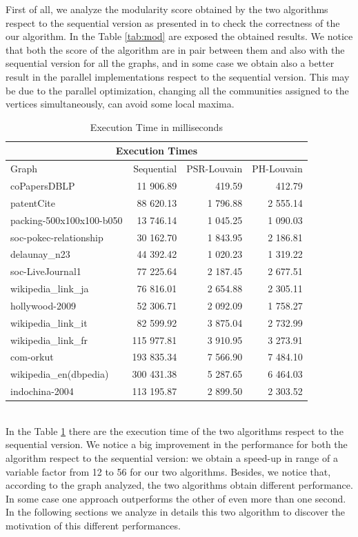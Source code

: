 First of all, we analyze the modularity score obtained by the two algorithms respect to the sequential version as presented in \cite{Blondel_2008} to check the correctness of the our algorithm. In the Table \ref{tab:mod} are exposed the obtained results. We notice that both the score of the algorithm are in pair between them and also with the sequential version for all the graphs, and in some case we obtain also a better result in the parallel implementations respect to the sequential version. This  may be due to the parallel optimization, changing all the communities assigned to the vertices simultaneously, can avoid some local maxima.
\begin{table}
	\centering
	\begin{tabular}{ |l||r||r|r|}
		\hline
		\multicolumn{4}{|c|}{Execution Times} \\
		\hline
		Graph & Sequential & PSR-Louvain & PH-Louvain \\
		\hline
		coPapersDBLP 			&  11 906.89 &   419.59 &  412.79 \\
		patentCite 				&  88 620.13 & 1 796.88 & 2 555.14 \\
		packing-500x100x100-b050&  13 746.14 & 1 045.25 & 1 090.03 \\
		soc-pokec-relationship	&  30 162.70 & 1 843.95 & 2 186.81 \\ 
		delaunay\_n23 			&  44 392.42 & 1 020.23 & 1 319.22 \\
		soc-LiveJournal1 		&  77 225.64 & 2 187.45 & 2 677.51 \\
		wikipedia\_link\_ja 	&  76 816.01 & 2 654.88 & 2 305.11 \\
		hollywood-2009 			&  52 306.71 & 2 092.09 & 1 758.27 \\
		wikipedia\_link\_it 	&  82 599.92 & 3 875.04 & 2 732.99 \\
		wikipedia\_link\_fr 	& 115 977.81 & 3 910.95 & 3 273.91 \\
		com-orkut 				& 193 835.34 & 7 566.90 & 7 484.10 \\
		wikipedia\_en(dbpedia) 	& 300 431.38 & 5 287.65 & 6 464.03 \\
		indochina-2004 			& 113 195.87 & 2 899.50 & 2 303.52 \\
		\hline
	\end{tabular}
	\caption{\label{tab:execution_time}Execution Time in milliseconds}
\end{table} \\
In the Table \ref{tab:execution_time} there are the execution time of the two algorithms respect to the sequential version. We notice a big improvement in the performance for both the algorithm respect to the sequential version: we obtain a speed-up in range of a variable factor from 12 to 56 for our two algorithms. 
Besides, we notice that, according to the graph analyzed, the two algorithms obtain different performance. In some case one approach outperforms the other of even more than one second. In the following sections we analyze in details this two algorithm to discover the motivation of this different performances.  
